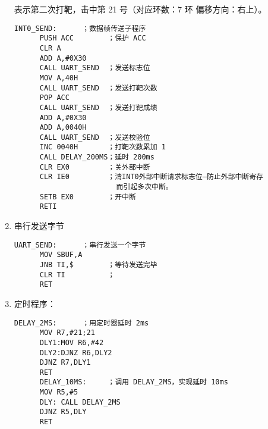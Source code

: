 \begin{enumerate}
  表示第二次打靶，击中第 21 号（对应环数：7 环 偏移方向：右上）。
  \begin{lstlisting}[basicstyle=\linespread{1.32}\small\ttfamily\selectfont, breaklines=true]
      INT0_SEND:      ；数据帧传送子程序
      PUSH ACC        ；保护 ACC
      CLR A
      ADD A,#0X30
      CALL UART_SEND  ；发送标志位
      MOV A,40H
      CALL UART_SEND  ；发送打靶次数
      POP ACC
      CALL UART_SEND  ；发送打靶成绩
      ADD A,#0X30
      ADD A,0040H
      CALL UART_SEND  ；发送校验位
      INC 0040H       ；打靶次数累加 1
      CALL DELAY_200MS；延时 200ms
      CLR EX0         ；关外部中断
      CLR IE0         ；清INT0外部中断请求标志位—防止外部中断寄存
                        而引起多次中断。
      SETB EX0        ；开中断
      RETI
  \end{lstlisting}
  \item 串行发送字节
  \begin{lstlisting}[basicstyle=\linespread{1.32}\small\ttfamily\selectfont, breaklines=true]
      UART_SEND:      ；串行发送一个字节
      MOV SBUF,A
      JNB TI,$        ；等待发送完毕
      CLR TI          ；
      RET
  \end{lstlisting}
  \item 定时程序：
  \begin{lstlisting}[basicstyle=\linespread{1.32}\small\ttfamily\selectfont, breaklines=true]
      DELAY_2MS:      ；用定时器延时 2ms
      MOV R7,#21;21
      DLY1:MOV R6,#42
      DLY2:DJNZ R6,DLY2
      DJNZ R7,DLY1
      RET
      DELAY_10MS:     ；调用 DELAY_2MS，实现延时 10ms
      MOV R5,#5
      DLY: CALL DELAY_2MS
      DJNZ R5,DLY
      RET
\end{lstlisting}
\end{enumerate}